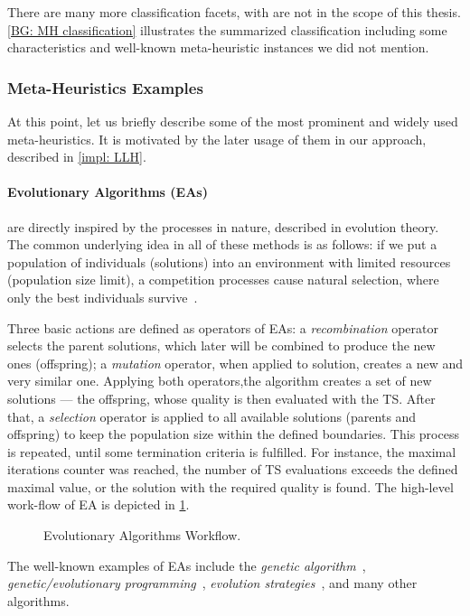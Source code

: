 There are many more classification facets, with are not in the scope of this thesis. \cref{BG: MH classification} illustrates the summarized classification including some characteristics and well-known meta-heuristic instances we did not mention.


\subsubsection{Meta-Heuristics Examples}\label{BG: MH Examples}
At this point, let us briefly describe some of the most prominent and widely used meta-heuristics. It is motivated by the later usage of them in our approach, described in \cref{impl: LLH}.

\paragraph{Evolutionary Algorithms (EAs)} are directly inspired by the processes in nature, described in evolution theory. The common underlying idea in all of these methods is as follows: if we put a population of individuals (solutions) into an environment with limited resources (population size limit), a competition processes cause natural selection, where only the best individuals survive~\cite{eiben2015evolutionary}.

Three basic actions are defined as operators of EAs: a \emph{recombination} operator selects the parent solutions, which later will be combined to produce the new ones (offspring); a \emph{mutation} operator, when applied to solution, creates a new and very similar one. Applying both operators,the algorithm creates a set of new solutions — the offspring, whose quality is then evaluated with the TS. After that, a \textit{selection} operator is applied to all available solutions (parents and offspring) to keep the population size within the defined boundaries. This process is repeated, until some termination criteria is fulfilled. For instance, the maximal iterations counter was reached, the number of TS evaluations exceeds the defined maximal value, or the solution with the required quality is found. The high-level work-flow of EA is depicted in \cref{bg:pic:EAs}.

\begin{figure}
	\centering
	
	\caption{Evolutionary Algorithms Workflow.}
	\label{bg:pic:EAs}
\end{figure}

The well-known examples of EAs include the \textit{genetic algorithm}~\cite{sastry2005genetic}, \textit{genetic/evolutionary programming}~\cite{koza1992evolution}, \textit{evolution strategies}~\cite{beyer2002evolution}, and many other algorithms.

